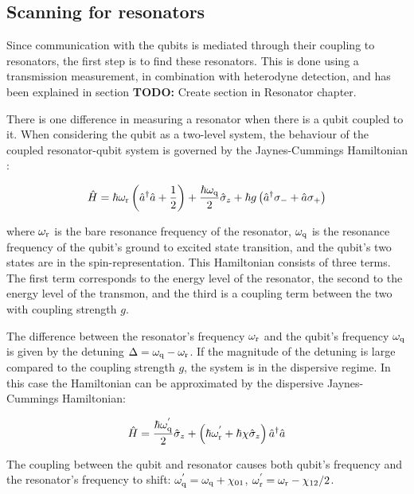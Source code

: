       \subsection{Scanning for resonators}
        \label{sec:resonator-scan}
        Since communication with the qubits is mediated through their coupling to resonators, the first step is to find these resonators. This is done using a transmission measurement, in combination with heterodyne detection, and has been explained in section \textbf{TODO:} Create section in Resonator chapter.

        There is one difference in measuring a resonator when there is a qubit coupled to it. When considering the qubit as a two-level system, the behaviour of the coupled resonator-qubit system is governed by the Jaynes-Cummings Hamiltonian \cite{Reed}:

        \begin{equation}
          \hat{H} = \hbar \omega_\text{r}\left(\hat{a}^\dagger \hat{a} + \frac{1}{2} \right) + \frac{\hbar \omega_\text{q}}{2}\hat{\sigma}_z + \hbar g \left(\hat{a}^\dagger \sigma_{-} + \hat{a}\sigma_{+}\right)
          \label{eq:Jaynes-Cummings}
        \end{equation}

        where $\omega_\text{r}$ is the bare resonance frequency of the resonator, $\omega_\text{q}$ is the resonance frequency of the qubit's ground to excited state transition, and the qubit's two states are in the spin-representation. This Hamiltonian consists of three terms. The first term corresponds to the energy level of the resonator, the second to the energy level of the transmon, and the third is a coupling term between the two with coupling strength $g$.

        The difference between the resonator's frequency $\omega_\text{r}$ and the qubit's frequency $\omega_\text{q}$ is given by the detuning $\Delta = \omega_\text{q} - \omega_\text{r}$. If the magnitude of the detuning is large compared to the coupling strength $g$, the system is in the dispersive regime. In this case the Hamiltonian can be approximated by the dispersive Jaynes-Cummings Hamiltonian:

        \begin{equation}
          \hat{H} = \frac{\hbar \omega_\text{q}^{'}}{2} \hat{\sigma}_z +  \left(\hbar \omega_\text{r}^{'} + \hbar \chi \hat{\sigma}_z\right) \hat{a}^\dagger \hat{a}
          \label{eq:dispersive-Jaynes-Cummings}
        \end{equation}

        The coupling between the qubit and resonator causes both qubit's frequency and the resonator's frequency to shift: $\omega_\text{q}^{'} = \omega_\text{q} + \chi_{01}$, $\omega_\text{r}^{'}=\omega_\text{r} - \chi_{12}/2$.

